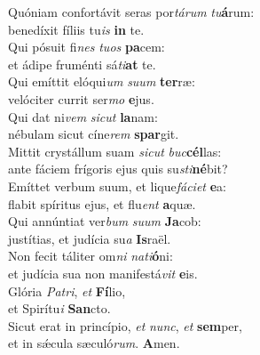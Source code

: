 \evenverse Quóniam confortávit seras por\textit{tá}\textit{rum} \textit{tu}\textbf{á}rum:~\*\\
\evenverse benedíxit fíliis tu\textit{is} \textbf{in} te.\\
\oddverse Qui pósuit fi\textit{nes} \textit{tu}\textit{os} \textbf{pa}cem:~\*\\
\oddverse et ádipe fruménti sá\textit{ti}\textbf{at} te.\\
\evenverse Qui emíttit elóqui\textit{um} \textit{su}\textit{um} \textbf{ter}ræ:~\*\\
\evenverse velóciter currit ser\textit{mo} \textbf{e}jus.\\
\oddverse Qui dat ni\textit{vem} \textit{si}\textit{cut} \textbf{la}nam:~\*\\
\oddverse nébulam sicut cíne\textit{rem} \textbf{spar}git.\\
\evenverse Mittit crystállum suam \textit{si}\textit{cut} \textit{buc}\textbf{cél}las:~\*\\
\evenverse ante fáciem frígoris ejus quis su\textit{sti}\textbf{né}bit?\\
\oddverse Emíttet verbum suum, et lique\textit{fá}\textit{ci}\textit{et} \textbf{e}a:~\*\\
\oddverse flabit spíritus ejus, et flu\textit{ent} \textbf{a}quæ.\\
\evenverse Qui annúntiat ver\textit{bum} \textit{su}\textit{um} \textbf{Ja}cob:~\*\\
\evenverse justítias, et judícia su\textit{a} \textbf{Is}raël.\\
\oddverse Non fecit táliter om\textit{ni} \textit{na}\textit{ti}\textbf{ó}ni:~\*\\
\oddverse et judícia sua non manifestá\textit{vit} \textbf{e}is.\\
\evenverse Glória \textit{Pa}\textit{tri}, \textit{et} \textbf{Fí}lio,~\*\\
\evenverse et Spirítu\textit{i} \textbf{San}cto.\\
\oddverse Sicut erat in princípio, \textit{et} \textit{nunc}, \textit{et} \textbf{sem}per,~\*\\
\oddverse et in sǽcula sæculó\textit{rum}. \textbf{A}men.\\
